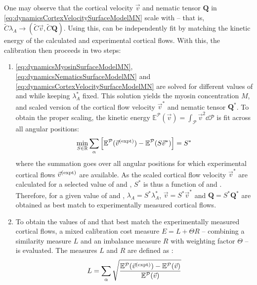 One may observe that the cortical velocity $\vec{v}$ and nematic tensor $\mathbf{Q}$ in \autoref{eq:dynamicsCortexVelocitySurfaceModelMN} scale with \activeRelaxLength -- that is, $\tilde{C} \lambda_A \rightarrow (\tilde{C}\vec{v}, \tilde{C}\mathbf{Q})$. Using this, \activeRelaxLength can be independently fit by matching the kinetic energy of the calculated and experimental cortical flows. With this, the calibration then proceeds in two steps:
\begin{enumerate}
    \item \autoref{eq:dynamicsMyosinSurfaceModelMN}, \autoref{eq:dynamicsNematicsSurfaceModelMN} and \autoref{eq:dynamicsCortexVelocitySurfaceModelMN} are solved for different values of \hydrodynamicLength and \nematicLength while keeping $\lambda_A^*$ fixed. This solution yields the myosin concentration $M$, and scaled version of the cortical flow velocity $\vec{v}^*$ and nematic tensor $\mathbf{Q}^*$. To obtain the proper scaling, the kinetic energy $\mathbb{E}^\mathcal{P}(\vec{v}) = \int_\mathcal{P} \vec{v}^2 \dd{\mathcal{P}}$ is fit across all angular positions:
    \begin{equation*}
        \min_{S \in \mathbb{R}}\sum_\alpha \left[ \mathbb{E}^\mathcal{P}(\vec{v}^{(\textrm{expt})}) - \mathbb{E}^\mathcal{P}(S\vec{v}^*) \right] = S^*
    \end{equation*}
    where the summation goes over all angular positions for which experimental cortical flows $\vec{v}^{(\textrm{expt})}$ are available. As the scaled cortical flow velocity $\vec{v}^*$ are calculated for a selected value of \hydrodynamicLength and \nematicLength, $S^*$ is thus a function of \hydrodynamicLength and \nematicLength. Therefore, for a given value of \hydrodynamicLength and \nematicLength, $\lambda_A = S^*\lambda_A^*$, $\vec{v} = S^*\vec{v}^*$ and $\mathbf{Q} = S^*\mathbf{Q}^*$ are obtained as best match to experimentally measured cortical flows. 
    \item To obtain the values of \hydrodynamicLength and \nematicLength that best match the experimentally measured cortical flows, a mixed calibration cost measure $E = L + \Theta R$ -- combining a similarity measure $L$ and an imbalance measure $R$ with weighting factor $\Theta$ -- is evaluated. The measures $L$ and $R$ are defined as \citep{}:
    \begin{align*}
        L &= \sum_\alpha \sqrt{\frac{\mathbb{E}^\mathcal{P}(\speciesSuper{\vec{v}}{\textrm{expt}}) - \mathbb{E}^\mathcal{P}(\vec{v})}{\mathbb{E}^\mathcal{P}(\vec{v})}} \\

\end{align*}
\end{enumerate}
